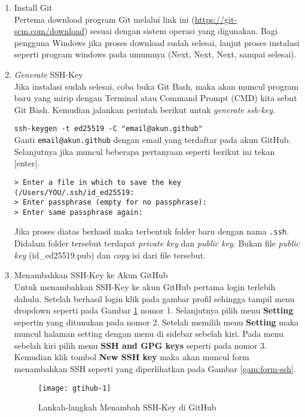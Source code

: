 \documentclass[a4paper]{tufte-handout}
\begin{document}
\begin{enumerate}
\item Install Git \\
Pertema download program Git melalui link ini (\url{https://git-scm.com/download}) sesuai dengan sistem operasi yang digunakan. Bagi pengguna Windows jika proses download sudah selesai, lanjut proses instalasi seperti program windows pada umumnya (Next, Next, Next, sampai selesai).

\item \textit{Generate} SSH-Key \\
Jika instalasi sudah selesai, coba buka Git Bash, maka akan muncul program baru yang mirip dengan Terminal atau Command Prompt (CMD) kita sebut Git Bash. Kemudian jalankan perintah berikut untuk \textit{generate ssh-key}.

{\tt ssh-keygen -t ed25519 -C "email@akun.github"} \\

Ganti {\tt email@akun.github} dengan email yang terdaftar pada akun GitHub. Selanjutnya jika muncul beberapa pertanyaan seperti berikut ini tekan [enter].

{\tt > Enter a file in which to save the key (/Users/YOU/.ssh/id\_ed25519:} \\
{\tt > Enter passphrase (empty for no passphrase):} \\
{\tt > Enter same passphrase again:}

Jika proses diatas berhasil maka terbentuk folder baru dengan nama {\tt .ssh}. Didalam folder tersebut terdapat \textit{private key} dan \textit{public key}. Bukan file \textit{public key} (id\_ed25519.pub) dan \textit{copy} isi dari file tersebut.

\item Menambahkan SSH-Key ke Akun GitHub \\
Untuk menambahkan SSH-Key ke akun GitHub pertama login terlebih dahulu. Setelah berhasil login klik pada gambar profil sehingga tampil menu dropdown seperti pada Gambar \ref{gam:langkah-ssh} nomor 1. Selanjutnya pilih menu \textbf{Setting} sepertin yang ditunukan pada nomor 2. Setelah memilih menu \textbf{Setting} maka muncul halaman setting dengan menu di sidebar sebelah kiri. Pada menu sebelah kiri pilih menu \textbf{SSH and GPG keys} seperti pada nomor 3. Kemudian klik tombol \textbf{New SSH key} maka akan muncul form menambahkan SSH seperti yang diperlihatkan pada Gambar \ref{gam:form-ssh}.

\begin{figure}[!ht]
\texttt{[image: gtihub-1]}
\caption{Lankah-langkah Menambah SSH-Key di GitHub}
\label{gam:langkah-ssh}
\end{figure}


\end{enumerate}
\end{document}

